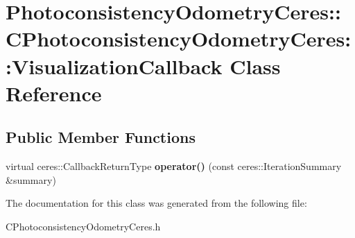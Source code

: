 \hypertarget{class_photoconsistency_odometry_ceres_1_1_c_photoconsistency_odometry_ceres_1_1_visualization_callback}{
\section{PhotoconsistencyOdometryCeres::CPhotoconsistencyOdometryCeres::VisualizationCallback Class Reference}
\label{class_photoconsistency_odometry_ceres_1_1_c_photoconsistency_odometry_ceres_1_1_visualization_callback}
}
\subsection*{Public Member Functions}
\begin{DoxyCompactItemize}
\item 
\hypertarget{class_photoconsistency_odometry_ceres_1_1_c_photoconsistency_odometry_ceres_1_1_visualization_callback_ac1b5eb05fad0c5287ce18b484a9d4624}{
virtual ceres::CallbackReturnType {\bfseries operator()} (const ceres::IterationSummary \&summary)}
\label{class_photoconsistency_odometry_ceres_1_1_c_photoconsistency_odometry_ceres_1_1_visualization_callback_ac1b5eb05fad0c5287ce18b484a9d4624}

\end{DoxyCompactItemize}


The documentation for this class was generated from the following file:\begin{DoxyCompactItemize}
\item 
CPhotoconsistencyOdometryCeres.h\end{DoxyCompactItemize}
